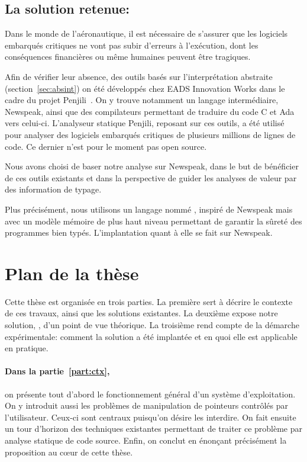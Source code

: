 \subsection*{La solution retenue: \langname{}}

Dans le monde de l'aéronautique, il est nécessaire de s'assurer que les
logiciels embarqués critiques ne vont pas subir d'erreurs à l'exécution, dont
les conséquences financières ou même humaines peuvent être tragiques.

Afin de vérifier leur absence, des outils basés sur l'interprétation abstraite
(section~\ref{sec:absint}) on été développés chez EADS Innovation Works dans le
cadre du projet Penjili~. On y trouve notamment un langage
intermédiaire, Newspeak\cite{newspeak}, ainsi que des compilateurs permettant de
traduire du code C et Ada vers celui-ci. L'analyseur statique Penjili, reposant
sur ces outils, a été utilisé pour analyser des logiciels embarqués critiques de
plusieurs millions de lignes de code. Ce dernier n'est pour le moment pas open
source.

Nous avons choisi de baser notre analyse sur Newspeak, dans le but de bénéficier
de ces outils existants et dans la perspective de guider les analyses de valeur
par des information de typage.

Plus précisément, nous utilisons un langage nommé \langname, inspiré de Newspeak
mais avec un modèle mémoire de plus haut niveau permettant de garantir la sûreté
des programmes bien typés. L'implantation quant à elle se fait sur Newspeak.

\section{Plan de la thèse}

Cette thèse est organisée en trois parties. La première sert à décrire le
contexte de ces travaux, ainsi que les solutions existantes. La deuxième expose
notre solution, \langname, d'un point de vue théorique. La troisième rend compte
de la démarche expérimentale: comment la solution a été implantée et en quoi
elle est applicable en pratique.

\paragraph{Dans la partie~\ref{part:ctx},} on présente tout d'abord le
fonctionnement général d'un système d'exploitation. On y introduit aussi les
problèmes de manipulation de pointeurs contrôlés par l'utilisateur. Ceux-ci sont
centraux puisqu'on désire les interdire. On fait ensuite un tour d'horizon des
techniques existantes permettant de traiter ce problème par analyse statique de
code source. Enfin, on conclut en énonçant précisément la proposition au cœur de
cette thèse.

